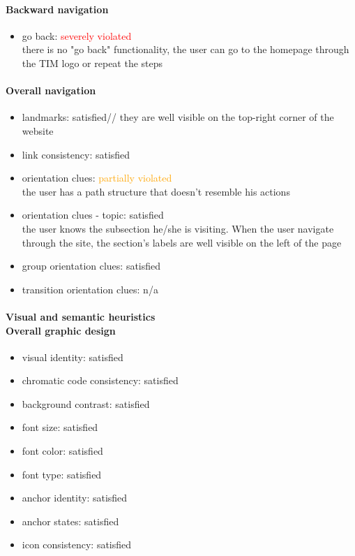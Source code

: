 \begin{enumerate}
	\paragraph*{Backward navigation}
	\begin{itemize}
		\item go back: \textcolor{red}{severely violated}\\
		there is no "go back" functionality, the user can go to the homepage through the TIM logo or repeat the steps
	\end{itemize}
	
	\paragraph*{Overall navigation}
	\begin{itemize}
		\item landmarks: satisfied//
		they are well visible on the top-right corner of the website 
		\item link consistency: satisfied
		\item orientation clues: \textcolor{orange}{partially violated}\\
		the user has a path structure that doesn't resemble his actions
		\item orientation clues - topic: satisfied\\
		the user knows the subsection he/she is visiting. When the user navigate through the site, the section's labels are well visible on the left of the page
		\item group orientation clues: satisfied
		\item transition orientation clues: n/a
	\end{itemize}	
	
	\paragraph*{Visual and semantic heuristics \\ Overall graphic design }
	\begin{itemize}
		\item visual identity: satisfied
		\item chromatic code consistency: satisfied
		\item background contrast: satisfied
		\item font size: satisfied
		\item font color: satisfied
		\item font type: satisfied
		\item anchor identity: satisfied
		\item anchor states: satisfied
		\item icon consistency: satisfied
	\end{itemize}
	

\end{enumerate}
